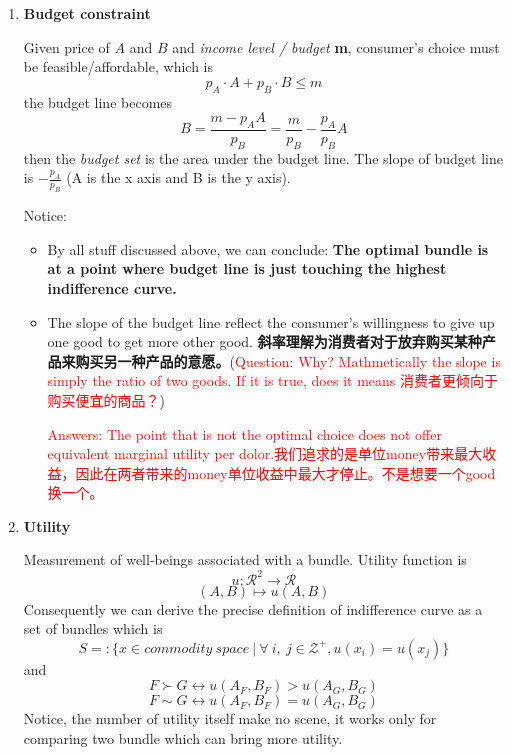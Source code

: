 \documentclass[10pt]{article}
\newenvironment{changemargin}[2]{%
  \begin{list}{}{%
    \setlength{\topsep}{0pt}%
    \setlength{\leftmargin}{#1}%
    \setlength{\rightmargin}{#2}%
    \setlength{\listparindent}{\parindent}%
    \setlength{\itemindent}{\parindent}%
    \setlength{\parsep}{\parskip}%
  }%
  \item[]}{\end{list}}
\begin{document}
\begin{changemargin}{-0.125in}{0in}
\begin{enumerate}
         \medskip
         
         \item \textbf{Budget constraint}
         
         \smallskip
         
         Given price of $A$ and $B$ and \textit{income level / budget} \textbf{m}, consumer's choice must be feasible/affordable, which is 
         \[
         p_A \cdot A + p_B \cdot B \leq m
         \]
         the budget line becomes
         \[
         B = \frac{m - p_AA}{p_B} = \frac{m}{p_B}  - \frac{p_A}{p_B}A
         \]
         then the \textit{budget set} is the area under the budget line. The slope of budget line is $-\frac{p_A}{p_B}$ (A is the x axis and B is the y axis).
         
         \smallskip
         Notice:
         \begin{itemize}
         	\item  By all stuff discussed above, we can conclude: \textbf{The optimal bundle is at a point where budget line is just touching the highest indifference curve. } 
         	
         	\smallskip
         	
         	\item The slope of the budget line reflect the consumer's willingness to give up one good to get more other good. \textbf{斜率理解为消费者对于放弃购买某种产品来购买另一种产品的意愿。}(\textcolor{red}{Question: Why? Mathmetically the slope is simply the ratio of two goods. If it is true, does it means 消费者更倾向于购买便宜的商品？})
         	     
         	     \smallskip
         	     
         	     \textcolor{red}{Answers: The point that is not the optimal choice does not offer equivalent marginal utility per dolor.我们追求的是单位money带来最大收益，因此在两者带来的money单位收益中最大才停止。不是想要一个good换一个。}  
         \end{itemize}
         
         \medskip
                 
         \item \textbf{Utility}
         
         \smallskip
         
         Measurement of well-beings associated with a bundle. Utility function is 
         \[
         u: \mathcal{R}^2 \longrightarrow \mathcal{R}
         \]
         \[
         (A,B) \longmapsto u(A,B)
         \]
         Consequently we can derive the precise definition of indifference curve as a set of bundles which is 
         \[
         S =: \{x \in commodity\:space \:\big| \: \forall\:i, \:j \in \mathcal{Z}^+, u(x_i) = u(x_j) \}
         \]
         and 
         \[ 
         F \succ G \longleftrightarrow u(A_F, B_F) > u(A_G, B_G)
         \]
         \[
         F \sim G \longleftrightarrow u(A_F, B_F) = u(A_G, B_G)
         \]
         Notice, the number of utility itself make no scene, it works only for comparing two bundle which can bring more utility.
           

\end{enumerate}
\end{changemargin}
\end{document}
